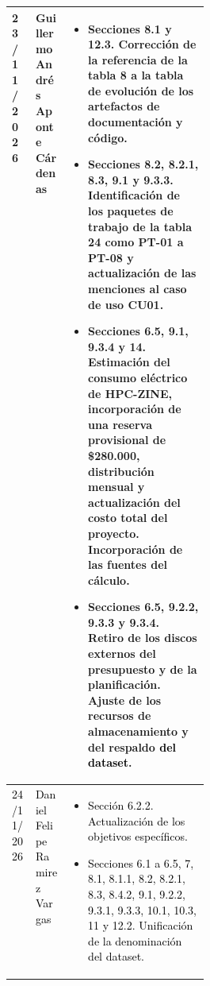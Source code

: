 \begin{longtable}{|p{0.12\linewidth}|p{0.17\linewidth}|p{}|}
23/11/2026 & Guillermo Andrés Aponte Cárdenas &
\vspace{-\baselineskip}
\begin{itemize}
    \setlength{\itemsep}{0pt}
    \setlength{\parskip}{0pt}
    \setlength{\topsep}{0pt}
    \item Secciones 8.1 y 12.3. Corrección de la referencia de la tabla 8 a la tabla de evolución de los artefactos de documentación y código.
    \item Secciones 8.2, 8.2.1, 8.3, 9.1 y 9.3.3. Identificación de los paquetes de trabajo de la tabla 24 como PT-01 a PT-08 y actualización de las menciones al caso de uso CU01.
    \item Secciones 6.5, 9.1, 9.3.4 y 14. Estimación del consumo eléctrico de HPC-ZINE, incorporación de una reserva provisional de \$280.000, distribución mensual y actualización del costo total del proyecto. Incorporación de las fuentes del cálculo.
    \item Secciones 6.5, 9.2.2, 9.3.3 y 9.3.4. Retiro de los discos externos del presupuesto y de la planificación. Ajuste de los recursos de almacenamiento y del respaldo \textcolor{black}{del dataset}.
\end{itemize}\\\hline\textcolor{black}{24/11/2026} & \textcolor{black}{Daniel Felipe Ramirez Vargas} & \vspace{-\baselineskip}\begin{itemize}\setlength{\itemsep}{0pt}\setlength{\parskip}{0pt}\setlength{\topsep}{0pt} \item \textcolor{black}{Sección 6.2.2. Actualización de los objetivos específicos.} \item \textcolor{black}{Secciones 6.1 a 6.5, 7, 8.1, 8.1.1, 8.2, 8.2.1, 8.3, 8.4.2, 9.1, 9.2.2, 9.3.1, 9.3.3, 10.1, 10.3, 11 y 12.2. Unificación de la denominación del dataset.}\end{itemize}\\\hline
\end{longtable}\endgroup

